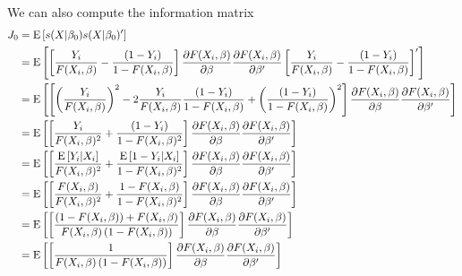 We can also compute the information matrix \begin{align*}
J_0 & = \operatorname{E}\left[s(X\vert\beta_0)s(X\vert\beta_0)'\right] \\ &= \operatorname{E}\left[\left[\frac{Y_i}{F(X_i,\beta)} - \frac{(1 - Y_i)}{1 - F(X_i,\beta)}\right]\frac{\partial F(X_i,\beta)}{\partial\beta} \frac{\partial F(X_i,\beta)}{\partial\beta'}\left[\frac{Y_i}{F(X_i,\beta)} - \frac{(1 - Y_i)}{1 - F(X_i,\beta)}\right]'\right] \\ & = \operatorname{E}\left[\left[\left(\frac{Y_i}{F(X_i,\beta)}\right)^2 - 2\frac{Y_i}{F(X_i,\beta)} \frac{(1 - Y_i)}{1 - F(X_i,\beta)} + \left(\frac{(1 - Y_i)}{1 - F(X_i,\beta)}\right)^2 \right] \frac{\partial F(X_i,\beta)}{\partial\beta} \frac{\partial F(X_i,\beta)}{\partial\beta'}\right] \\ & = \operatorname{E}\left[\left[\frac{Y_i}{F(X_i,\beta)^2} + \frac{(1 - Y_i)}{1 - F(X_i,\beta)^2}\right] \frac{\partial F(X_i,\beta)}{\partial\beta} \frac{\partial F(X_i,\beta)}{\partial\beta'}\right] \\ 
& = \operatorname{E}\left[\left[\frac{\operatorname{E}\left[Y_i|X_i\right]}{F(X_i,\beta)^2} + \frac{\operatorname{E}\left[1 - Y_i|X_i\right]}{1 - F(X_i,\beta)^2}\right] \frac{\partial F(X_i,\beta)}{\partial\beta} \frac{\partial F(X_i,\beta)}{\partial\beta'}\right]\\ 
& = \operatorname{E}\left[\left[\frac{F(X_i,\beta)}{F(X_i,\beta)^2} + \frac{1 - F(X_i,\beta)}{1 - F(X_i,\beta)^2}\right] \frac{\partial F(X_i,\beta)}{\partial\beta} \frac{\partial F(X_i,\beta)}{\partial\beta'}\right]\\ 
& = \operatorname{E}\left[\left[\frac{(1 - F(X_i,\beta)) + F(X_i,\beta)}{F(X_i,\beta) \left(1 - F(X_i,\beta)\right)}\right] \frac{\partial F(X_i,\beta)}{\partial\beta} \frac{\partial F(X_i,\beta)}{\partial\beta'}\right]\\ 
& = \operatorname{E}\left[\left[\frac{1}{F(X_i,\beta) \left(1 - F(X_i,\beta)\right)}\right] \frac{\partial F(X_i,\beta)}{\partial\beta} \frac{\partial F(X_i,\beta)}{\partial\beta'}\right]
\end{align*}